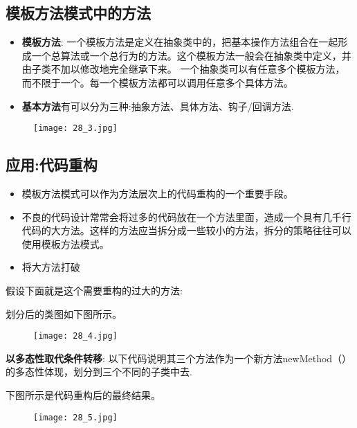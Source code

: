 \documentclass[../main.tex]{subfiles}
\begin{document}
\subsection{模板方法模式中的方法}
\begin{itemize}
  \item \textbf{模板方法}:
    一个模板方法是定义在抽象类中的，把基本操作方法组合在一起形成一个总算法或一个总行为的方法。这个模板方法一般会在抽象类中定义，并由子类不加以修改地完全继承下来。
    一个抽象类可以有任意多个模板方法，而不限于一个。每一个模板方法都可以调用任意多个具体方法。
  \item \textbf{基本方法}有可以分为三种:抽象方法、具体方法、钩子/回调方法.
\end{itemize}
%
\begin{figure}[H]
  \texttt{[image: 28\_3.jpg]}
\end{figure}
%
\subsection{应用:代码重构}
\begin{itemize}
  \item 模板方法模式可以作为方法层次上的代码重构的一个重要手段。
  \item 不良的代码设计常常会将过多的代码放在一个方法里面，造成一个具有几千行代码的大方法。这样的方法应当拆分成一些较小的方法，拆分的策略往往可以使用模板方法模式。
  \item 将大方法打破
\end{itemize}
%
假设下面就是这个需要重构的过大的方法:
%

%

%
划分后的类图如下图所示。
\begin{figure}[H]
  \texttt{[image: 28\_4.jpg]}
\end{figure}
%
\textbf{以多态性取代条件转移}:
以下代码说明其三个方法作为一个新方法newMethod（）的多态性体现，划分到三个不同的子类中去.
%

%
下图所示是代码重构后的最终结果。
%
\begin{figure}[H]
  \texttt{[image: 28\_5.jpg]}
\end{figure}
%
\end{document}
